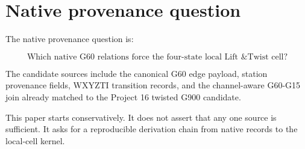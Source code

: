 \section{Native provenance question}

The native provenance question is:

\[
    \text{Which native G60 relations force the four-state local Lift \& Twist cell?}
\]

The candidate sources include the canonical G60 edge payload, station provenance fields, WXYZTI transition records, and the channel-aware G60-G15 join already matched to the Project 16 twisted G900 candidate.

This paper starts conservatively.  It does not assert that any one source is sufficient.  It asks for a reproducible derivation chain from native records to the local-cell kernel.
